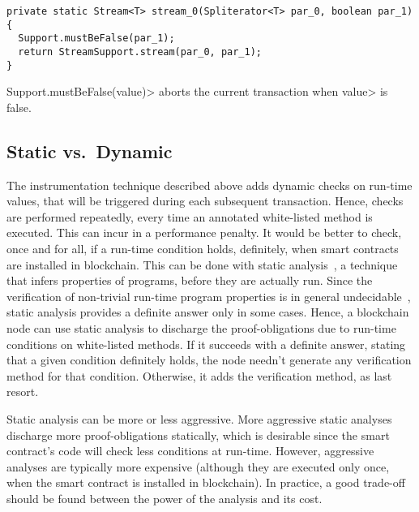 {\small\begin{verbatim}
private static Stream<T> stream_0(Spliterator<T> par_0, boolean par_1) {
  Support.mustBeFalse(par_1);
  return StreamSupport.stream(par_0, par_1);
}
\end{verbatim}}

\noindent
\<Support.mustBeFalse(value)> aborts the current transaction when \<value> is false.



\subsection{Static vs.\ Dynamic}\label{subsec:static_vs_dynamic}

The instrumentation technique described above adds dynamic checks on run-time values,
that will be triggered during each subsequent transaction.
Hence, checks are performed repeatedly, every time an annotated white-listed method
is executed. This can incur in a performance penalty. It would be better
to check, once and for all,
if a run-time condition holds, definitely, when smart contracts
are installed in blockchain.
This can be done with static analysis~\cite{NielsonNH99}, a technique that infers
properties of programs, before they are actually run. Since the verification of
non-trivial run-time program properties is in general undecidable~\cite{Rice53},
static analysis provides a definite answer
only in some cases. Hence, a blockchain node can use static analysis to discharge
the proof-obligations due to run-time conditions on white-listed methods. If it
succeeds with a definite answer, stating that a given condition definitely holds,
the node needn't generate any verification method for that condition. Otherwise, it
adds the verification method, as last resort.

Static analysis can be more or less aggressive.
More aggressive static analyses discharge more proof-obligations statically,
which is desirable since the smart contract's code will check less
conditions at run-time. However, aggressive analyses are typically more expensive
(although they are executed only once, when the smart contract is installed in
blockchain). In practice, a good trade-off should be found between the power of the analysis
and its cost.

